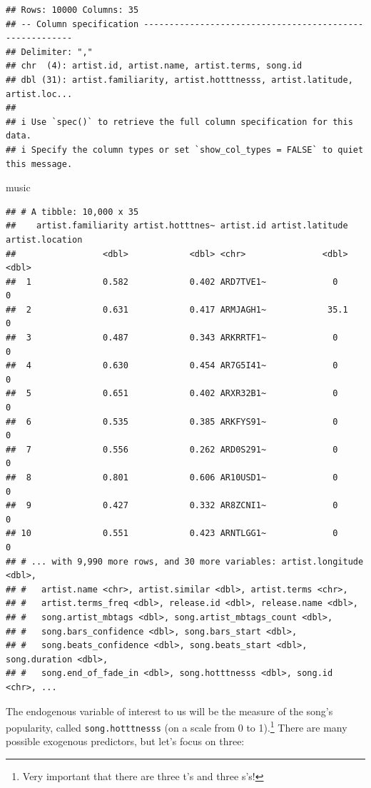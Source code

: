 \documentclass[
]{book}
\newenvironment{Shaded}{\begin{snugshade}}{\end{snugshade}}
\newcommand{\NormalTok}[1]{#1}
\begin{document}
\begin{verbatim}
## Rows: 10000 Columns: 35
## -- Column specification --------------------------------------------------------
## Delimiter: ","
## chr  (4): artist.id, artist.name, artist.terms, song.id
## dbl (31): artist.familiarity, artist.hotttnesss, artist.latitude, artist.loc...
## 
## i Use `spec()` to retrieve the full column specification for this data.
## i Specify the column types or set `show_col_types = FALSE` to quiet this message.
\end{verbatim}

\begin{Shaded}
\begin{Highlighting}[]
\NormalTok{music}
\end{Highlighting}
\end{Shaded}

\begin{verbatim}
## # A tibble: 10,000 x 35
##    artist.familiarity artist.hotttnes~ artist.id artist.latitude artist.location
##                 <dbl>            <dbl> <chr>               <dbl>           <dbl>
##  1              0.582            0.402 ARD7TVE1~             0                 0
##  2              0.631            0.417 ARMJAGH1~            35.1               0
##  3              0.487            0.343 ARKRRTF1~             0                 0
##  4              0.630            0.454 AR7G5I41~             0                 0
##  5              0.651            0.402 ARXR32B1~             0                 0
##  6              0.535            0.385 ARKFYS91~             0                 0
##  7              0.556            0.262 ARD0S291~             0                 0
##  8              0.801            0.606 AR10USD1~             0                 0
##  9              0.427            0.332 AR8ZCNI1~             0                 0
## 10              0.551            0.423 ARNTLGG1~             0                 0
## # ... with 9,990 more rows, and 30 more variables: artist.longitude <dbl>,
## #   artist.name <chr>, artist.similar <dbl>, artist.terms <chr>,
## #   artist.terms_freq <dbl>, release.id <dbl>, release.name <dbl>,
## #   song.artist_mbtags <dbl>, song.artist_mbtags_count <dbl>,
## #   song.bars_confidence <dbl>, song.bars_start <dbl>,
## #   song.beats_confidence <dbl>, song.beats_start <dbl>, song.duration <dbl>,
## #   song.end_of_fade_in <dbl>, song.hotttnesss <dbl>, song.id <chr>, ...
\end{verbatim}

The endogenous variable of interest to us will be the measure of the song's popularity, called \texttt{song.hotttnesss} (on a scale from 0 to 1).\footnote{Very important that there are three t's and three s's!} There are many possible exogenous predictors, but let's focus on three:
\end{document}
